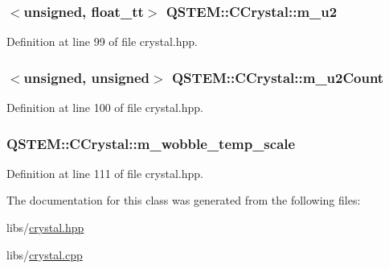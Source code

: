 \hypertarget{class_q_s_t_e_m_1_1_c_crystal_a880590aa8c6ee5b7da1b6b31069b6751}{
\subsubsection[{m\-\_\-u2}]{$<$unsigned, {\bf float\-\_\-tt}$>$ Q\-S\-T\-E\-M\-::\-C\-Crystal\-::m\-\_\-u2\hspace{0.3cm}{\ttfamily [protected]}}}\label{class_q_s_t_e_m_1_1_c_crystal_a880590aa8c6ee5b7da1b6b31069b6751}


Definition at line 99 of file crystal.\-hpp.

\hypertarget{class_q_s_t_e_m_1_1_c_crystal_a320ae1aadd9aed66f4efd1ba46a4ce65}{
\subsubsection[{m\-\_\-u2\-Count}]{$<$unsigned, unsigned$>$ Q\-S\-T\-E\-M\-::\-C\-Crystal\-::m\-\_\-u2\-Count\hspace{0.3cm}{\ttfamily [protected]}}}\label{class_q_s_t_e_m_1_1_c_crystal_a320ae1aadd9aed66f4efd1ba46a4ce65}


Definition at line 100 of file crystal.\-hpp.

\hypertarget{class_q_s_t_e_m_1_1_c_crystal_a3f8dfe01f61a0f327fba564d7e317295}{
\subsubsection[{m\-\_\-wobble\-\_\-temp\-\_\-scale}]{ Q\-S\-T\-E\-M\-::\-C\-Crystal\-::m\-\_\-wobble\-\_\-temp\-\_\-scale\hspace{0.3cm}{\ttfamily [protected]}}}\label{class_q_s_t_e_m_1_1_c_crystal_a3f8dfe01f61a0f327fba564d7e317295}


Definition at line 111 of file crystal.\-hpp.



The documentation for this class was generated from the following files\-:\begin{DoxyCompactItemize}
\item 
libs/\hyperlink{crystal_8hpp}{crystal.\-hpp}\item 
libs/\hyperlink{crystal_8cpp}{crystal.\-cpp}\end{DoxyCompactItemize}
